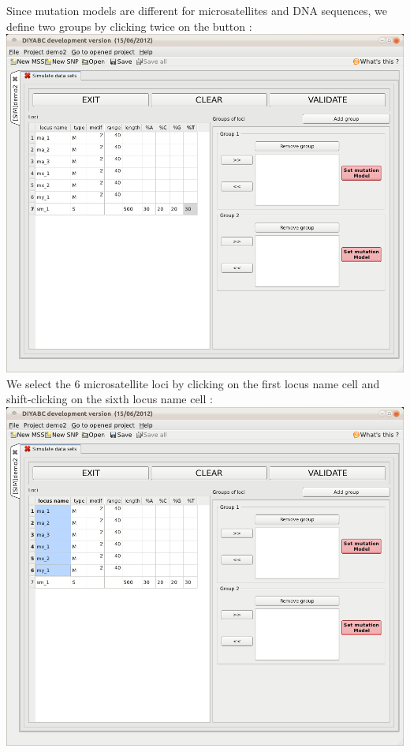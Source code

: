 Since mutation models are different for microsatellites and DNA sequences,
we define two groups by clicking twice on the 
button :\\


\includegraphics[scale=0.33]{gui_pictures/Capture-DIYABC-75} \\


We select the 6 microsatellite loci by clicking on the first locus
name cell and shift-clicking on the sixth locus name cell :\\


\includegraphics[scale=0.33]{gui_pictures/Capture-DIYABC-76} \\


